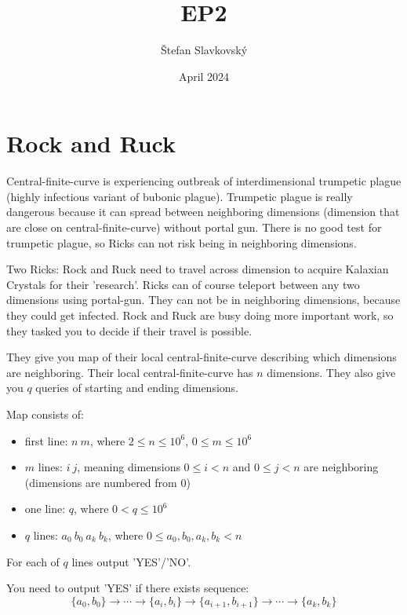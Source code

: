 \documentclass{article}
\title{EP2}
\author{Štefan Slavkovský}
\date{April 2024}
\begin{document}
\maketitle
{
    \centering
    \section*{Rock and Ruck}
    \par
}

Central-finite-curve is experiencing outbreak
of interdimensional trumpetic plague (highly infectious variant of bubonic plague).
Trumpetic plague is really dangerous because it can spread between neighboring dimensions
(dimension that are close on central-finite-curve) without portal gun.
There is no good test for trumpetic plague, so Ricks can
not risk being in neighboring dimensions.

Two Ricks: Rock and Ruck need to travel across dimension
to acquire Kalaxian Crystals for their 'research'. Ricks can
of course teleport between any two dimensions using portal-gun. They can not be in neighboring dimensions, because they could get infected.
Rock and Ruck are busy doing more important work, so they tasked you to decide if their travel is possible.

They give you map of their local central-finite-curve describing which dimensions are neighboring. Their local central-finite-curve has $n$ dimensions.
They also give you $q$ queries of starting and ending dimensions.

Map consists of:
\begin{itemize}
    \item first line: $n~m$, where $2 \leqslant n \leqslant 10^6$, $0 \leqslant m \leqslant 10^6$
    \item $m$ lines: $i~j$, meaning dimensions $0 \leqslant i < n$ and $0 \leqslant j < n$ are neighboring (dimensions are numbered from 0)
    \item one line: $q$, where $0 < q \leqslant 10^6$
    \item $q$ lines: $a_0~b_0~a_k~b_k$, where $0 \leqslant a_0, b_0, a_k, b_k < n$
\end{itemize}

For each of $q$ lines output 'YES'/'NO'.

You need to output 'YES' if there exists sequence:
\begin{equation*}
    \{a_0, b_0\} \to
    \cdots \to
    \{a_i, b_i\} \to
    \{a_{i+1}, b_{i+1}\} \to
    \cdots \to
    \{a_k, b_k\}
\end{equation*}
\end{document}
